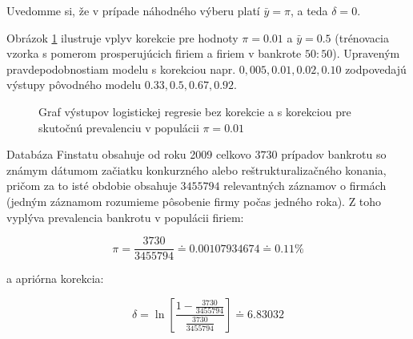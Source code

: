 Uvedomme si, že v prípade náhodného výberu platí \( \bar{y} = \pi \), a teda \( \delta = 0 \).

Obrázok \ref{correction_demo} ilustruje vplyv korekcie pre hodnoty \( \pi = 0.01 \) a \( \bar{y} = 0.5 \) (trénovacia vzorka s pomerom prosperujúcich firiem a firiem v bankrote \(50:50\)).
Upraveným pravdepodobnostiam modelu s korekciou napr. \(0,005, 0.01, 0.02, 0.10\) zodpovedajú výstupy pôvodného modelu \(0.33, 0.5, 0.67, 0.92\).

\begin{figure}
\caption{Graf výstupov logistickej regresie bez korekcie a s korekciou pre skutočnú prevalenciu v populácii \( \pi = 0.01\)}
\label{correction_demo}
\end{figure}

Databáza Finstatu obsahuje od roku 2009 celkovo \(3730\) prípadov bankrotu so známym dátumom začiatku konkurzného alebo reštrukturalizačného konania,
pričom za to isté obdobie obsahuje \(3 455 794\) relevantných záznamov o firmách (jedným záznamom rozumieme pôsobenie firmy počas jedného roka).
Z toho vyplýva prevalencia bankrotu v populácii firiem:

\[
    \pi = \frac{3730}{3455794} \doteq 0.00107934674 \doteq 0.11 \%   
\]

a apriórna korekcia:

\[
    \delta = \ln \left[  \frac{1 - \frac{3730}{3455794}}{\frac{3730}{3455794}} \right] \doteq 6.83032
\]

